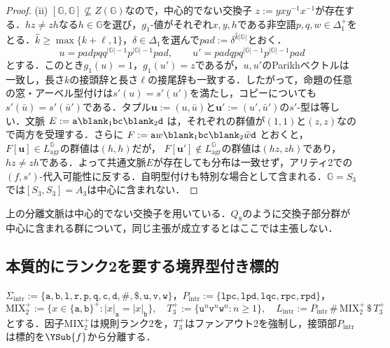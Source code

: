 \begin{proof}
(ii) $[{\mathbb G},{\mathbb G}]\not\subseteq Z({\mathbb G})$なので，中心的でない交換子
$z:=yx y^{-1}x^{-1}$が存在する．$hz\ne zh$なる$h\in {\mathbb G}$を選び，$g_1$-値がそれぞれ$x,y,h$である非空語$p,q,w\in\Delta_1^+$をとる．$\hat k\ge\max\{k+\ell,1\}$，$\delta\in\Delta_1$を選んで$\mathit{pad}:=\delta^{\hat k|{\mathbb G}|}$とおく．
\[
 u=\mathit{pad} p q q^{|{\mathbb G}|-1}p^{|{\mathbb G}|-1}\mathit{pad},\qquad
 u'=\mathit{pad} q p q^{|{\mathbb G}|-1}p^{|{\mathbb G}|-1}\mathit{pad}
\]
とする．このとき$g_1(u)=1$，$g_1(u')=z$であるが，$u,u'$のParikhベクトルは一致し，長さ$k$の接頭辞と長さ$\ell$の接尾辞も一致する．したがって，命題の任意の窓・アーベル型付けは$s'(u)=s'(u')$を満たし，コピーについても$s'(\bar u)=s'(\bar u')$である．タプル$\mathbf u:=(u,\bar u)$と$\mathbf u':=(u',\bar u')$の$s'$-型は等しい．文脈
$E:=\mathtt a\blank_1\mathtt{bc}\blank_2\mathtt d$
は，それぞれの群値が$(1,1)$と$(z,z)$なので両方を受理する．さらに
$F:=\mathtt a w\blank_1\mathtt{bc}\blank_2\bar w\mathtt d$
とおくと，$F[\mathbf u]\in L_{\mathrm{agr}}^{\mathbb G}$の群値は$(h,h)$だが，
$F[\mathbf u']\notin L_{\mathrm{agr}}^{\mathbb G}$の群値は$(hz,zh)$であり，$hz\ne zh$である．よって共通文脈$E$が存在しても分布は一致せず，アリティ2での$(f,s')$-代入可能性に反する．自明型付けも特別な場合として含まれる．${\mathbb G}=S_3$では$[S_3,S_3]=A_3$は中心に含まれない．
\end{proof}

\begin{remark}
上の分離文脈は中心的でない交換子を用いている．$Q_8$のように交換子部分群が中心に含まれる群について，同じ主張が成立するとはここでは主張しない．
\end{remark}

\subsection{本質的にランク2を要する境界型付き標的}
\label{subsec:intrinsic-ranktwo}

$\Sigma_{\mathrm{intr}}:=\{\mathtt a,\mathtt b,\mathtt l,\mathtt r,\mathtt p,\mathtt q,\mathtt c,\mathtt d,\mathtt\#,\mathtt\$,\mathtt u,\mathtt v,\mathtt w\}$，$P_{\mathrm{intr}}:=\{\mathtt{lpc},\mathtt{lpd},\mathtt{lqc},\mathtt{rpc},\mathtt{rpd}\}$，
\[
 \mathrm{MIX}_2^+:=\{x\in\{\mathtt a,\mathtt b\}^+:|x|_{\mathtt a}=|x|_{\mathtt b}\},\quad
 T_3^+:=\{\mathtt u^n\mathtt v^n\mathtt w^n:n\ge1\},\quad
 L_{\mathrm{intr}}:=P_{\mathrm{intr}}\,\mathtt\#\,\mathrm{MIX}_2^+\,\mathtt\$\,T_3^+
\]
とする．因子$\mathrm{MIX}_2^+$は規則ランク2を，$T_3^+$はファンアウト2を強制し，接頭部$P_{\mathrm{intr}}$は標的を$\YSub{f}$から分離する．

